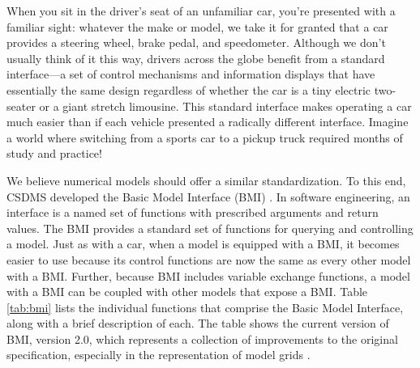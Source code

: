 \documentclass[12pt]{amsart}
\begin{document}
When you sit in the driver's seat of an unfamiliar car,
you're presented with a familiar sight:
whatever the make or model,
we take it for granted that a car provides
a steering wheel, brake pedal, and speedometer.
Although we don't usually think of it this way,
drivers across the globe benefit
from a standard interface---a set of control mechanisms and information displays
that have %
essentially the same design
regardless of whether the car
is a tiny electric two-seater or a giant stretch limousine.
This standard interface makes operating a car much easier
than if each vehicle presented a radically different interface.
Imagine a world where switching from a sports car to a pickup truck
required months of study and practice!

We believe %
numerical models should offer a similar standardization.
To this end, CSDMS
developed the Basic Model Interface (BMI) \citep{peckham2013component,hutton2020bmi}.
In software engineering,
an interface is a named set of functions
with prescribed arguments and return values.
The BMI provides a standard set of functions
for querying and controlling a model.
Just as with a car,
when a model is equipped with a BMI,
it becomes easier to use
because its control functions are now the same as every other model with a BMI.
Further, because BMI includes variable exchange functions,
a model with a BMI can be coupled with other models that expose a BMI.
Table \ref{tab:bmi} lists the individual functions
that comprise the Basic Model Interface,
along with a brief description of each.
The table shows the current version of BMI, version 2.0,
which represents a collection of improvements to the original specification,
especially in the representation of model grids \citep{hutton2020bmi}.
\end{document}
